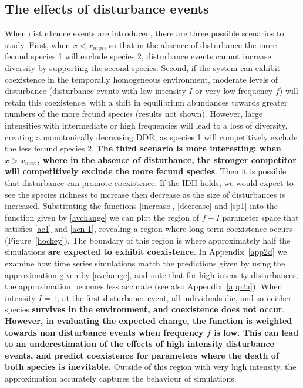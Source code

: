 \subsection{The effects of disturbance events} \label{ss:resultsdist}
When disturbance events are introduced, there are three possible scenarios to study. First, when $x<x_{min}$, so that in the absence of disturbance the more fecund species 1 will exclude species 2, disturbance events cannot increase diversity by supporting the second species. Second, if the system can exhibit coexistence in the temporally homogeneous environment, moderate levels of disturbance (disturbance events with low intensity $I$ or very low frequency $f$) will retain this coexistence, with a shift in equilibrium abundances towards greater numbers of the more fecund species (results not shown). However, large intensities with intermediate or high frequencies will lead to a loss of diversity, creating a monotonically decreasing DDR, as species 1 will competitively exclude the less fecund species 2. \textbf{The third scenario is more interesting: when $x>x_{max}$, where in the absence of disturbance, the stronger competitor will competitively exclude the more fecund species}. Then it is possible that disturbance can promote coexistence. If the IDH holds, we would expect to see the species richness to increase then decrease as the size of disturbances is increased. Substituting the functions \eqref{increase}, \eqref{decrease} and \eqref{sp1} into the function given by \eqref{avchange} we can plot the region of $f-I$ parameter space that satisfies \eqref{ac1} and \eqref{acn-1}, revealing a region where long term coexistence occurs (Figure~\ref{hockey}).  The boundary of this region is where approximately half the simulations \textbf{are expected to exhibit coexistence}. In Appendix~\ref{app2d} we examine how time series simulations match the predictions given by using the approximation given by \eqref{avchange}, and note that for high intensity disturbances, the approximation becomes less accurate (see also Appendix~\ref{app2a}). When intensity $I=1$, at the first disturbance event, all individuals die, and so neither species \textbf{survives in the environment, and coexistence does not occur}. \textbf{However, in evaluating the expected change, the function is weighted towards non disturbance events when frequency $f$ is low. This can lead to an underestimation of the effects of high intensity disturbance events, and predict coexistence for parameters where the death of both species is inevitable.}
 Outside of this region with very high intensity, the approximation accurately captures the behaviour of simulations.

